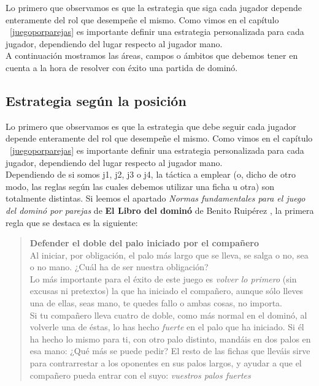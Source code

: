 Lo primero que observamos es que la estrategia que siga cada jugador depende enteramente del rol que desempeñe el mismo.
Como vimos en el capítulo ~\ref{juegoporparejas} es importante definir una estrategia personalizada para cada jugador,
dependiendo del lugar respecto al jugador mano. \\

A continuación mostramos las áreas, campos o ámbitos que debemos tener en cuenta a la hora de resolver con éxito
una partida de dominó.

\subsection{Estrategia según la posición}

Lo primero que observamos es que la estrategia que debe seguir cada jugador depende enteramente del rol que desempeñe el mismo.
Como vimos en el capítulo ~\ref{juegoporparejas} es importante definir una estrategia personalizada para cada jugador,
dependiendo del lugar respecto al jugador mano. \\

Dependiendo de si somos j1, j2, j3 o j4, la táctica a emplear (o, dicho de otro modo, las reglas según las cuales
debemos utilizar una ficha u otra) son totalmente distintas. Si leemos el apartado \emph{Normas fundamentales para el
juego del dominó por parejas} de \textbf{El Libro del dominó} de Benito Ruipérez \cite{mora90}, la primera regla que se
destaca es la siguiente:

\begin{quote}
    \textbf{Defender el doble del palo iniciado por el compañero} \\
    Al iniciar, por obligación, el palo más largo que se lleva, se salga o no, sea o no mano. ¿Cuál ha de ser nuestra
    obligación?\\
    Lo más importante para el éxito de este juego es \emph{volver lo primero} (sin excusas ni pretextos) la que ha iniciado
    el compañero, aunque sólo lleves una de ellas, seas mano, te quedes fallo o ambas cosas, no importa.\\
    Si tu compañero lleva cuatro de doble, como más normal en el dominó, al volverle una de éstas, lo has hecho \emph{fuerte}
    en el palo que ha iniciado. Si él ha hecho lo mismo para ti, con otro palo distinto, mandáis en dos palos en
    esa mano: ¿Qué más se puede pedir? El resto de las fichas que lleváis sirve para contrarrestar a los oponentes en sus
    palos largos, y ayudar a que el compañero pueda entrar con el suyo: \emph{vuestros palos fuertes}
\end{quote}

